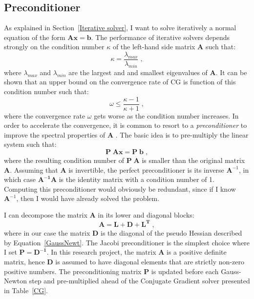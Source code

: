 \subsection{Preconditioner}
As explained in Section~\ref{Iterative solver}, I want to solve iteratively a normal equation of the form $\mathbf{Ax=b}$. The performance of iterative solvers depends strongly on the condition number $\kappa$ of the left-hand side matrix $\mathbf{A}$ such that:
\begin{equation}
\kappa = \frac{\lambda_{max}}{\lambda_{min}}\;,
\end{equation}
where $\lambda_{max}$ and $\lambda_{min}$ are the largest and and smallest eigenvalues of $\mathbf{A}$.
It can be shown that an upper bound on the convergence rate of CG is function of this condition number such that:
\begin{equation}
\omega \le \frac{\kappa -1}{\kappa+1}\;,
\end{equation}  
where the convergence rate $\omega$ gets worse as the condition number increases.
In order to accelerate the convergence, it is common to resort to a \emph{preconditioner} to improve the spectral properties of $\mathbf{A}$ \cite[]{Vorst2003}.
The basic idea is to pre-multiply the linear system such that:
\begin{equation}
\mathbf{P\;Ax = P\;b}\;,
\end{equation} 
where the resulting condition number of $\mathbf{P\;A}$ is smaller than the original matrix $\mathbf{A}$. 
Assuming that $\mathbf{A}$ is invertible, the perfect preconditioner is its inverse $\mathbf{A}^{-1}$, in which case  $\mathbf{A^{-1} A}$ is the identity matrix with a condition number of 1. 
Computing this preconditioner would obviously be redundant, since if I know $\mathbf{A}^{-1}$, then I would have already solved the problem.

I can decompose the matrix $\mathbf{A}$ in its lower and diagonal blocks:
\begin{equation}
\mathbf{A} =\mathbf{L + D + L^T}\;,
\end{equation} 
where in our case the matrix $\mathbf{D}$ is the diagonal of the pseudo Hessian described by Equation~\ref{GaussNewt}. The Jacobi preconditioner is the simplest choice where I set $\mathbf{P = D^{-1}}$.
In this research project, the matrix $\mathbf{A}$ is a positive definite matrix, hence $\mathbf{D}$ is assumed to have diagonal elements that are strictly non-zero positive numbers. The preconditioning matrix $\mathbf{P}$ is updated before each Gauss-Newton step and pre-multiplied ahead of the Conjugate Gradient solver presented in Table~\ref{CG}. 

